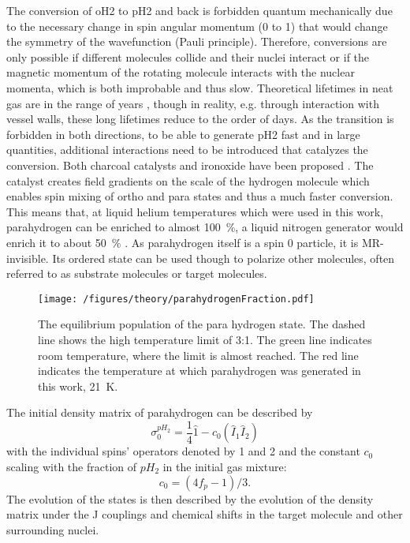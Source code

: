             The conversion of oH2 to pH2 and back is forbidden quantum mechanically due to the necessary change in spin angular momentum (0 to 1) that would change the symmetry of the wavefunction (Pauli principle)\cite{minaev_spin_1995}. Therefore, conversions are only possible if different molecules collide and their nuclei interact or if the magnetic momentum of the rotating molecule interacts with the nuclear momenta, which is both improbable and thus slow. Theoretical lifetimes in neat gas are in the range of years \cite{green_theory_2012-1}, though in reality, e.g. through interaction with vessel walls, these long lifetimes reduce to the order of days. As the transition is forbidden in both directions, to be able to generate pH2 fast and in large quantities, additional interactions need to be introduced that catalyzes the conversion. Both charcoal catalysts and ironoxide have been proposed \cite{dechent_proton_nodate}. The catalyst creates field gradients on the scale of the hydrogen molecule which enables spin mixing of ortho and para states\cite{minaev_spin_1995} and thus a much faster conversion. This means that, at liquid helium temperatures which were used in this work, parahydrogen can be enriched to almost \SI{100}{\%}, a liquid nitrogen generator would enrich it to about \SI{50}{\%} \cite{zhuzhgov_low-temperature_2018}.
            As parahydrogen itself is a spin 0 particle, it is MR-invisible. Its ordered state can be used though to polarize other molecules, often referred to as substrate molecules or target molecules.
            \begin{figure}
                \centering
                \texttt{[image: /figures/theory/parahydrogenFraction.pdf]}
                \caption[Parahydrogen fraction]{The equilibrium population of the para hydrogen state. The dashed line shows the high temperature limit of 3:1. The green line indicates room temperature, where the limit is almost reached. The red line indicates the temperature at which parahydrogen was generated in this work, \SI{21}{\kelvin}.}
                \label{figure:theory:ph2Fraction}
            \end{figure}
            The initial density matrix of parahydrogen can be described by
            \begin{equation}
                \sigma_0^{pH_2} = \frac{1}{4} \hat 1 - c_0(\hat{I}_1\hat{I}_2)
            \end{equation}
            with the individual spins' operators denoted by 1 and 2 \cite{green_theory_2012-1} and the constant $c_0$ scaling with the fraction of $pH_2$ in the initial gas mixture:
            \begin{equation*}
                c_0=(4f_p-1)/3.
            \end{equation*}
            The evolution of the states is then described by the evolution of the density matrix under the J couplings and chemical shifts in the target molecule and other surrounding nuclei. 
